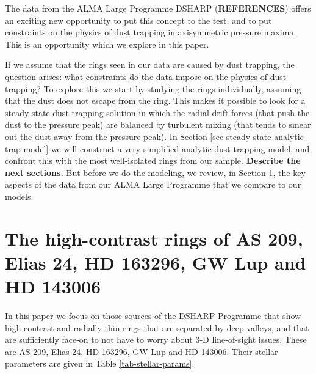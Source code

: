 \documentclass{aa}
\begin{document}
The data from the ALMA Large Programme DSHARP ({\bf REFERENCES}) offers an exciting new
opportunity to put this concept to the test, and to put constraints on the
physics of dust trapping in axisymmetric pressure maxima. This is an opportunity
which we explore in this paper.

If we assume that the rings seen in our data are caused by dust trapping, the
question arises: what constraints do the data impose on the physics of dust
trapping? To explore this we start by studying the rings individually, assuming
that the dust does not escape from the ring. This makes it possible to look for
a steady-state dust trapping solution in which the radial drift forces (that push
the dust to the pressure peak) are balanced by turbulent mixing (that tends to
smear out the dust away from the pressure peak). In Section
\ref{sec-steady-state-analytic-trap-model} we will construct a very simplified
analytic dust trapping model, and confront this with the most well-isolated
rings from our sample. {\bf Describe the next sections.} But before we do the
modeling, we review, in Section \ref{sec-data}, the key aspects of the data from
our ALMA Large Programme that we compare to our models.



\section{The high-contrast rings of AS 209, Elias 24, HD 163296, GW Lup and HD 143006}
\label{sec-data}
%
In this paper we focus on those sources of the DSHARP Programme
that show high-contrast and radially thin rings that are separated by deep
valleys, and that are sufficiently face-on to not have to worry about 3-D
line-of-sight issues. These are AS 209, Elias 24, HD 163296, GW Lup and
HD 143006. Their stellar parameters are given in Table \ref{tab-stellar-params}.
\end{document}
